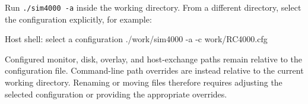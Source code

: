 Run \passthrough{\lstinline!./sim4000 -a!} inside the working directory. From a different directory, select the configuration explicitly, for example:

\begin{commandexample}[language=sh]{Host shell: select a configuration}
./work/sim4000 -a -c work/RC4000.cfg
\end{commandexample}

Configured monitor, disk, overlay, and host-exchange paths remain relative to the configuration file. Command-line path overrides are instead relative to the current working directory. Renaming or moving files therefore requires adjusting the selected configuration or providing the appropriate overrides.
